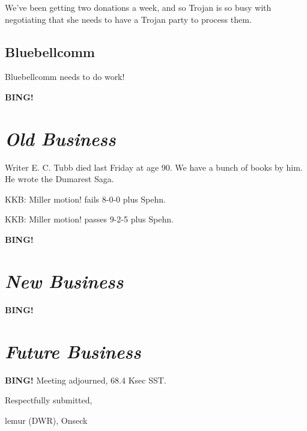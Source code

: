 \documentclass[10pt]{article}
\newcommand{\bing}{{\bf BING!} }
\newcommand{\goto}[1]{\bing \vskip 12pt \section*{{\em{#1}}}}
\newcommand{\ps}{ plus Spehn\xspace}
\newcommand{\onseck}{lemur (DWR), Onseck}
\begin{document}
We've been getting two donations a week, and so Trojan is so busy with
negotiating that she needs to have a Trojan party to process them.

\subsection*{Bluebellcomm}

Bluebellcomm needs to do work!

\goto{Old Business}

Writer E. C. Tubb died last Friday at age 90.
We have a bunch of books by him.  He wrote the Dumarest Saga.

KKB: Miller motion! fails 8-0-0\ps.

KKB: Miller motion! passes 9-2-5\ps.

\goto{New Business}

\goto{Future Business}

\bing
\noindent
Meeting adjourned, 68.4 Ksec SST.

\vspace{18pt}

\centerline{Respectfully submitted,}
\centerline{\onseck}
\end{document}
